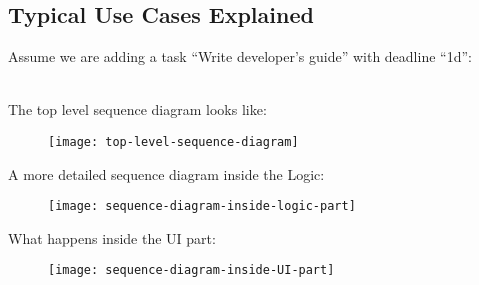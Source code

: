 \documentclass[12pt, a4paper]{article}
\begin{document}
\subsection{Typical Use Cases Explained}
Assume we are adding a task ``Write developer’s guide'' with deadline ``1d'':

\\The top level sequence diagram looks like:
\begin{figure}[h]
  \centering
  \texttt{[image: top-level-sequence-diagram]}
\end{figure}

A more detailed sequence diagram inside the Logic:
\begin{figure}[h]
  \centering
  \texttt{[image: sequence-diagram-inside-logic-part]}
\end{figure}


What happens inside the UI part:
\begin{figure}[h]
  \centering
  \texttt{[image: sequence-diagram-inside-UI-part]}
\end{figure}
\end{document}
